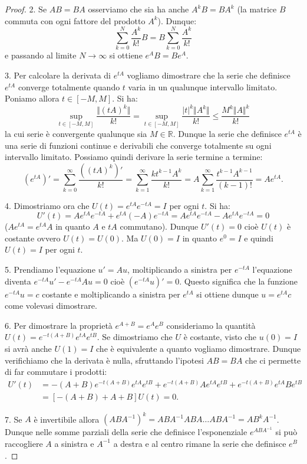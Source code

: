 \documentclass[italian,a4paper]{scrartcl}
\newcommand{\RR}{{\mathbb R}}
\begin{document}
\begin{theorem}
\begin{proof}
2. Se $AB=BA$ osserviamo che sia ha anche $A^k B=B A^k$ (la matrice $B$
commuta con ogni fattore del prodotto $A^k$). Dunque:
\[
 \sum_{k=0}^N \frac{A^k}{k!} B = B \sum_{k=0}^N \frac{A^k}{k!}
\]
e passando al limite $N\to \infty$ si ottiene $e^A B = B e^A$.

3. Per calcolare la derivata di $e^{tA}$ vogliamo dimostrare che la serie
che definisce $e^{tA}$ converge totalmente quando $t$ varia in un
qualunque intervallo limitato. Poniamo allora $t\in [-M,M]$. Si ha:
\[
  \sup_{t\in[-M,M]}\frac{\Vert (tA)^k\Vert}{k!}
  = \sup_{t\in[-M,M]}\frac{\lvert t\rvert^k \Vert A^k\Vert}{k!}
  \le \frac{M^k\Vert A\Vert^k}{k!}
\]
la cui serie è convergente qualunque sia $M\in \RR$. Dunque la serie
che definisce $e^{tA}$ è una serie di funzioni continue e derivabili
che converge totalmente su ogni intervallo limitato. Possiamo quindi
derivare la serie termine a termine:
\[
(e^{tA})' = \sum_{k=0}^\infty \frac{((tA)^k)'}{k!}
 = \sum_{k=1}^\infty \frac{kt^{k-1} A^k}{k!}
 = A \sum_{k=1}^\infty \frac{t^{k-1}A^{k-1}}{(k-1)!}
 = A e^{tA}.
\]

4. Dimostriamo ora che $U(t) = e^{tA}e^{-tA}=I$ per ogni $t$. Si ha:
\[
 U'(t) = A e^{tA}e^{-tA} + e^{tA}(-A)e^{-tA}
       = A e^{tA}e^{-tA} - A e^{tA}e^{-tA} = 0
\]
($Ae^{tA} = e^{tA}A$ in quanto $A$ e $tA$ commutano).
Dunque $U'(t)=0$ cioè $U(t)$ è costante ovvero $U(t)=U(0)$. Ma $U(0)=I$
in quanto $e^0=I$ e quindi $U(t)=I$ per ogni $t$.

5. Prendiamo l'equazione $u' = Au$, moltiplicando a sinistra per $e^{-tA}$ l'equazione diventa
$e^{-tA} u' - e^{-tA} Au=0$ cioè $(e^{-tA} u)' = 0$. Questo significa
che la funzione $e^{-tA}u = c$ costante e moltiplicando a sinistra per
$e^{tA}$ si ottiene dunque $u = e^{tA}c$ come volevasi dimostrare.

6. Per dimostrare la proprietà $e^{A+B}=e^A e^B$ consideriamo la quantità
$U(t) = e^{-t(A+B)} e^{tA} e^{tB}$. Se dimostriamo che $U$ è costante,
visto che $u(0)=I$ si avrà anche $U(1)=I$ che è equivalente a quanto
vogliamo dimostrare. Dunque verifichiamo che la derivata è nulla,
sfruttando l'ipotesi $AB=BA$ che ci permette di far commutare i prodotti:
\begin{align*}
U'(t) & = -(A+B)e^{-t(A+B)} e^{tA} e^{tB} + e^{-t(A+B)}Ae^{tA}e^{tB} +
e^{-t(A+B)}e^{tA} B e^{tB} \\
& = [-(A+B) + A + B] U(t) = 0.
\end{align*}

7. Se $A$ è invertibile allora $(ABA^{-1})^k = ABA^{-1}ABA\dots ABA^{-1}
= AB^k A^{-1}$. Dunque nelle somme parziali della serie che definisce l'esponenziale
$e^{ABA^{-1}}$ si può raccogliere $A$ a sinistra e $A^{-1}$ a destra e
al centro rimane la serie che definisce $e^B$.


\end{proof}
\end{theorem}
\end{document}
